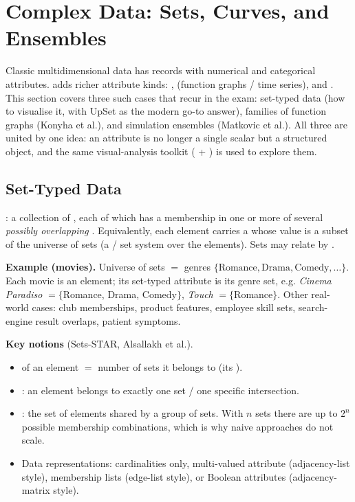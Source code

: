 \section{Complex Data: Sets, Curves, and Ensembles}

Classic multidimensional data has records with numerical and categorical
attributes.  adds richer attribute kinds: ,
 (function graphs / time series), and . This
section covers three such cases that recur in the exam: set-typed data
(how to visualise it, with UpSet as the modern go-to answer), families of
function graphs (Konyha et al.), and simulation ensembles (Matkovic et al.).
All three are united by one idea: an attribute is no longer a single scalar
but a structured object, and the same visual-analysis toolkit
( + ) is used to
explore them.

\subsection{Set-Typed Data}

\begin{keybox}[Definition]
: a collection of , each of which has a
membership in one or more of several \emph{possibly overlapping} .
Equivalently, each element carries a  whose value is
a subset of the universe of sets (a  / set system over the
elements). Sets may relate by .
\end{keybox}

\textbf{Example (movies).} Universe of sets $=$ genres
$\{\text{Romance},\text{Drama},\text{Comedy},\dots\}$. Each movie is an element;
its set-typed attribute is its genre set, e.g.
\textit{Cinema Paradiso} $=\{$Romance, Drama, Comedy$\}$, \textit{Touch}
$=\{$Romance$\}$. Other real-world cases: club memberships, product features,
employee skill sets, search-engine result overlaps, patient symptoms.

\textbf{Key notions} (Sets-STAR, Alsallakh et al.).
\begin{itemize}
\item {} of an element $=$ number of sets it
  belongs to (its ).
\item {}: an element belongs to exactly one set / one
  specific intersection.
\item {}: the set of elements shared by a group of
  sets. With $n$ sets there are up to $2^n$ possible membership combinations,
  which is why naive approaches do not scale.
\item Data representations: cardinalities only, multi-valued attribute
  (adjacency-list style), membership lists (edge-list style), or Boolean
  attributes (adjacency-matrix style).
\end{itemize}

